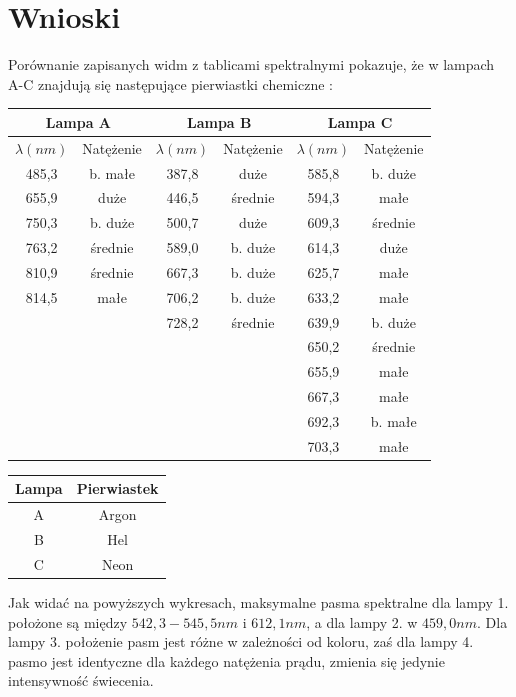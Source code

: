 \documentclass[10pt,a4paper]{article}
\newcommand{\forceindent}{\leavevmode{\parindent=3em\indent}}
\begin{document}
\newpage
\section*{Wnioski}
\forceindent Porównanie zapisanych widm z tablicami spektralnymi pokazuje, że w lampach A-C znajdują się następujące pierwiastki chemiczne :
\begin{center}
\begin{tabular}{|c|c|c|c|c|c|}
\multicolumn{2}{c}{Lampa A} & \multicolumn{2}{c}{Lampa B} & \multicolumn{2}{c}{Lampa C}\\
\hline
$\lambda (nm)$ & Natężenie & $\lambda (nm)$ & Natężenie & $\lambda (nm)$ & Natężenie\\
\hline
485,3 & b. małe & 387,8 & duże & 585,8 & b. duże\\
\hline
655,9 & duże & 446,5 & średnie & 594,3 & małe \\
\hline
750,3 & b. duże & 500,7 & duże & 609,3 & średnie \\
\hline
763,2 & średnie & 589,0 & b. duże & 614,3 & duże \\
\hline
810,9 & średnie & 667,3 & b. duże & 625,7 & małe \\
\hline
814,5 & małe & 706,2 & b. duże & 633,2 & małe \\
\hline
&& 728,2 & średnie & 639,9 & b. duże \\
\hline
&&&& 650,2 & średnie \\
\hline
&&&& 655,9 & małe \\
\hline
&&&& 667,3 & małe \\
\hline
&&&& 692,3 & b. małe \\
\hline
&&&& 703,3 & małe \\
\hline

\end{tabular}
\end{center}
\begin{center}
\begin{tabular}{|c|c|}
\hline
\textbf{Lampa} & \textbf{Pierwiastek} \\
\hline
A & Argon \\
\hline
B & Hel \\
\hline
C & Neon \\
\hline
\end{tabular}
\end{center}

\forceindent Jak widać na powyższych wykresach, maksymalne pasma spektralne dla lampy 1. położone są między $ 542,3 - 545,5 nm$ i $612,1 nm$, a dla lampy 2. w $459,0 nm$. Dla lampy 3. położenie pasm jest różne w zależności od koloru, zaś dla lampy 4. pasmo jest identyczne dla każdego natężenia prądu, zmienia się jedynie intensywność świecenia.\\
\end{document}
